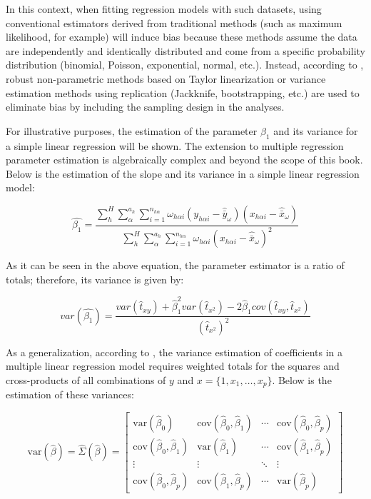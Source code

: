 \documentclass[
  12pt,
]{book}
\begin{document}
In this context, when fitting regression models with such datasets, using conventional estimators derived from traditional methods (such as maximum likelihood, for example) will induce bias because these methods assume the data are independently and identically distributed and come from a specific probability distribution (binomial, Poisson, exponential, normal, etc.). Instead, according to \citet{Wolter_2007}, robust non-parametric methods based on Taylor linearization or variance estimation methods using replication (Jackknife, bootstrapping, etc.) are used to eliminate bias by including the sampling design in the analyses.

For illustrative purposes, the estimation of the parameter \(\beta_{1}\) and its variance for a simple linear regression will be shown. The extension to multiple regression parameter estimation is algebraically complex and beyond the scope of this book. Below is the estimation of the slope and its variance in a simple linear regression model:

\[
\hat{\beta_{1}} = \frac{\sum_{h}^{H}\sum_{\alpha}^{a_{h}}\sum_{i=1}^{n_{h\alpha}}\omega_{h\alpha i}\left(y_{h\alpha i}-\hat{\bar{y}}_{\omega}\right)\left(x_{h\alpha i}-\hat{\bar{x}}_{\omega}\right)}{\sum_{h}^{H}\sum_{\alpha}^{a_{h}}\sum_{i=1}^{n_{h\alpha}}\omega_{h\alpha i}\left(x_{h\alpha i}-\hat{\bar{x}}_{\omega}\right)^{2}}
\]

As it can be seen in the above equation, the parameter estimator is a ratio of totals; therefore, its variance is given by:

\[
var\left(\hat{\beta_{1}}\right)  =  \frac{var\left(\hat{t}_{xy}\right)+\hat{\beta}_{1}^{2}var\left(\hat{t}_{x^{2}}\right)-2\hat{\beta}_{1}cov\left(\hat{t}_{xy},\hat{t}_{x^{2}}\right)}{\left(\hat{t}_{x^{2}}\right)^{2}}
\]

As a generalization, according to \citet{kish1974inference}, the variance estimation of coefficients in a multiple linear regression model requires weighted totals for the squares and cross-products of all combinations of \(y\) and \(x = \{1, x_{1}, \ldots, x_{p}\}\). Below is the estimation of these variances:

\[
\text{var}\left(\hat{\beta}\right) = \hat{\Sigma}\left(\hat{\beta}\right) = 
\begin{bmatrix}
\text{var}\left(\hat{\beta}_{0}\right) & \text{cov}\left(\hat{\beta}_{0},\hat{\beta}_{1}\right) & \cdots & \text{cov}\left(\hat{\beta}_{0},\hat{\beta}_{p}\right) \\
\text{cov}\left(\hat{\beta}_{0},\hat{\beta}_{1}\right) & \text{var}\left(\hat{\beta}_{1}\right) & \cdots & \text{cov}\left(\hat{\beta}_{1},\hat{\beta}_{p}\right) \\
\vdots & \vdots & \ddots & \vdots \\
\text{cov}\left(\hat{\beta}_{0},\hat{\beta}_{p}\right) & \text{cov}\left(\hat{\beta}_{1},\hat{\beta}_{p}\right) & \cdots & \text{var}\left(\hat{\beta}_{p}\right)
\end{bmatrix}
\]
\end{document}
